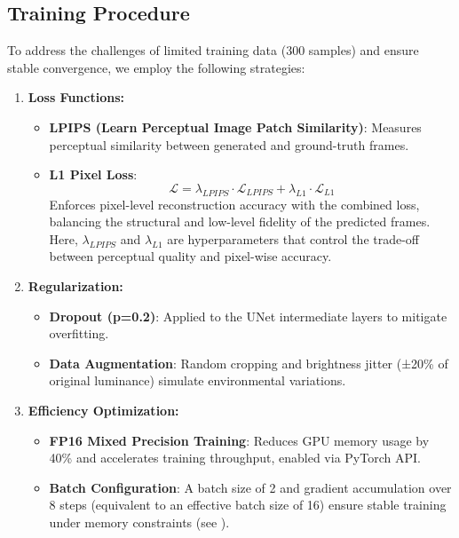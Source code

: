 \subsection{Training Procedure}
\label{sec:training-procedure}

To address the challenges of limited training data (300 samples) and ensure stable convergence, 
    we employ the following strategies:
\begin{enumerate}
    \item \textbf{Loss Functions:}
    \begin{itemize}
        \item \textbf{LPIPS (Learn Perceptual Image Patch Similarity)}: 
        Measures perceptual similarity between generated and ground-truth frames.
        \item \textbf{L1 Pixel Loss}: 
        \begin{equation}
            \mathcal{L} = \lambda_{LPIPS} \cdot \mathcal{L}_{LPIPS} + \lambda_{L1} \cdot \mathcal{L}_{L1}
        \end{equation}
        Enforces pixel-level reconstruction accuracy with the combined loss, 
            balancing the structural and low-level fidelity of the predicted frames. 
        Here, $\lambda_{LPIPS}$ and $\lambda_{L1}$ are hyperparameters that control the trade-off between perceptual quality and pixel-wise accuracy.
    \end{itemize}
    \item \textbf{Regularization:}
    \begin{itemize}
        \item \textbf{Dropout (p=0.2)}:
        Applied to the UNet intermediate layers to mitigate overfitting.
        \item \textbf{Data Augmentation}:
        Random cropping and brightness jitter (±20\% of original luminance) simulate environmental variations.
    \end{itemize}
    \item \textbf{Efficiency Optimization:}
    \begin{itemize}
        \item \textbf{FP16 Mixed Precision Training}:
        Reduces GPU memory usage by 40\% and accelerates training throughput, enabled via PyTorch  API.
        \item \textbf{Batch Configuration}:
        A batch size of 2 and gradient accumulation over 8 steps (equivalent to an effective batch size of 16) 
            ensure stable training under memory constraints (see ).
    \end{itemize}
\end{enumerate}

